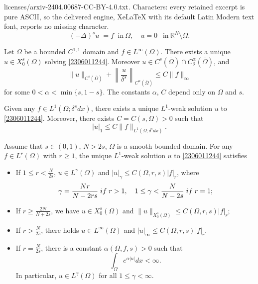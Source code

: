 \documentclass[10pt,a4paper]{amsart}
\def \O{\Omega}
\begin{document}
licenses/arxiv-2404.00687-CC-BY-4.0.txt. Characters: every retained excerpt is pure ASCII, so the delivered engine, XeLaTeX with its default Latin Modern text font, reports no missing character.
\begin{equation}\label{2306011244}
(-\Delta)^{s} u\;=f \;\;\text{in}~\Omega,\quad
u =0~\;\;\text{in} ~ \mathbb{R}^N\setminus\Omega.
\end{equation}

\begin{lemma}\label{2402061816}
Let $\Omega$ be a bounded $C^{1,1}$ domain and $f\in L^{\infty}(\Omega)$. There exists a unique $u\in X_0^s(\Omega)$ solving \eqref{2306011244}.  Moreover $u\in C^s(\overline{\Omega})\cap C_{\delta}^{\alpha}(\overline{\Omega})$, and
\[
\|u\|_{C^s(\overline{\Omega})}+ \left\|\frac{u}{\delta^s}\right\|_{C^\alpha(\overline{\Omega})}\le C\|f\|_{\infty}
\]
for some $0<\alpha<\min\{s, 1-s\}$. The constants $\alpha$, $C$ depend only on $\Omega$ and $s$.
\end{lemma}

\begin{proposition}\label{2304232341}
Given any $f\in L^1(\Omega; \delta^s dx) $, there exists a unique $L^1$-weak solution $u$ to \eqref{2306011244}. Moreover, there exists $C=C(s, \Omega)>0$ such that
\begin{equation}\label{2304142025}
|u|_1\le C\|f\|_{L^1(\Omega; \delta^s dx) }.
\end{equation}
\end{proposition}

\begin{proposition}\label{2211162013}
Assume that $s\in (0, 1)$, $N>2s$, $\Omega$ is a smooth bounded domain. For any $f\in L^r(\Omega)$ with $r\ge 1$, the unique $L^1$-weak solution $u$ to \eqref{2306011244} satisfies
\begin{itemize}
\item[\rm (i)] If $1 \le r < \frac{N}{2s}$, $u\in L^{\gamma}(\Omega)$ and $|u|_{\gamma}\le C(\Omega, r, s)|f|_r$,
where
\[
\gamma={\frac{Nr}{N-2rs}}\; {\rm if }\; r>1, \quad 1\le \gamma<\frac{N}{N-2s}\;{\rm if }\; r=1;
\]
\item[\rm (ii)] If $r \ge \frac{2N}{N+2s}$, we have $u\in X_0^s(\Omega)$ and $\|u\|_{X_0^s(\Omega)}\le C(\Omega, r, s)|f|_r$;
\item[\rm (iii)] If $r>\frac{N}{2s}$, there holds $u\in L^{\infty}(\Omega)$ and $|u|_{\infty}\le C(\Omega, r, s)|f|_{r}$.
\item[\rm (iv)] If $r=\frac{N}{2s}$, there is a constant $\alpha(\O, f, s) >0$ such that
\[
\int_{\Omega} e^{\alpha |u|} dx<\infty.
\]
In particular, $u\in L^\gamma(\Omega)$ for all $1\le \gamma<\infty$.
\end{itemize}
\end{proposition}
\end{document}

